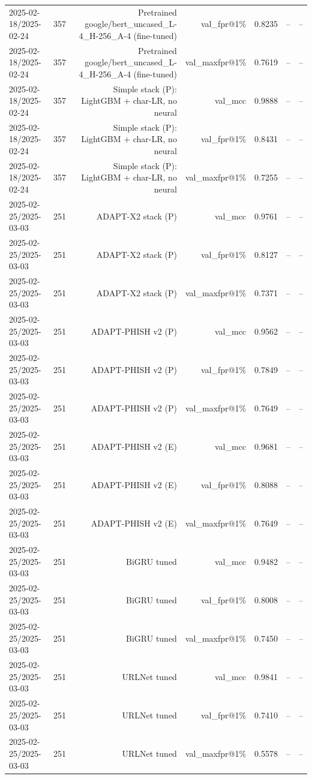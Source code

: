 \begin{table}[t]
\begin{tabular}{llrrrrr}
2025-02-18/2025-02-24 & 357 & Pretrained google/bert\_uncased\_L-4\_H-256\_A-4 (fine-tuned) & val\_fpr@1\% & 0.8235 & -- & -- \\
2025-02-18/2025-02-24 & 357 & Pretrained google/bert\_uncased\_L-4\_H-256\_A-4 (fine-tuned) & val\_maxfpr@1\% & 0.7619 & -- & -- \\
2025-02-18/2025-02-24 & 357 & Simple stack (P): LightGBM + char-LR, no neural & val\_mcc & 0.9888 & -- & -- \\
2025-02-18/2025-02-24 & 357 & Simple stack (P): LightGBM + char-LR, no neural & val\_fpr@1\% & 0.8431 & -- & -- \\
2025-02-18/2025-02-24 & 357 & Simple stack (P): LightGBM + char-LR, no neural & val\_maxfpr@1\% & 0.7255 & -- & -- \\
2025-02-25/2025-03-03 & 251 & ADAPT-X2 stack (P) & val\_mcc & 0.9761 & -- & -- \\
2025-02-25/2025-03-03 & 251 & ADAPT-X2 stack (P) & val\_fpr@1\% & 0.8127 & -- & -- \\
2025-02-25/2025-03-03 & 251 & ADAPT-X2 stack (P) & val\_maxfpr@1\% & 0.7371 & -- & -- \\
2025-02-25/2025-03-03 & 251 & ADAPT-PHISH v2 (P) & val\_mcc & 0.9562 & -- & -- \\
2025-02-25/2025-03-03 & 251 & ADAPT-PHISH v2 (P) & val\_fpr@1\% & 0.7849 & -- & -- \\
2025-02-25/2025-03-03 & 251 & ADAPT-PHISH v2 (P) & val\_maxfpr@1\% & 0.7649 & -- & -- \\
2025-02-25/2025-03-03 & 251 & ADAPT-PHISH v2 (E) & val\_mcc & 0.9681 & -- & -- \\
2025-02-25/2025-03-03 & 251 & ADAPT-PHISH v2 (E) & val\_fpr@1\% & 0.8088 & -- & -- \\
2025-02-25/2025-03-03 & 251 & ADAPT-PHISH v2 (E) & val\_maxfpr@1\% & 0.7649 & -- & -- \\
2025-02-25/2025-03-03 & 251 & BiGRU tuned & val\_mcc & 0.9482 & -- & -- \\
2025-02-25/2025-03-03 & 251 & BiGRU tuned & val\_fpr@1\% & 0.8008 & -- & -- \\
2025-02-25/2025-03-03 & 251 & BiGRU tuned & val\_maxfpr@1\% & 0.7450 & -- & -- \\
2025-02-25/2025-03-03 & 251 & URLNet tuned & val\_mcc & 0.9841 & -- & -- \\
2025-02-25/2025-03-03 & 251 & URLNet tuned & val\_fpr@1\% & 0.7410 & -- & -- \\
2025-02-25/2025-03-03 & 251 & URLNet tuned & val\_maxfpr@1\% & 0.5578 & -- & -- \\

\end{tabular}
\end{table}
